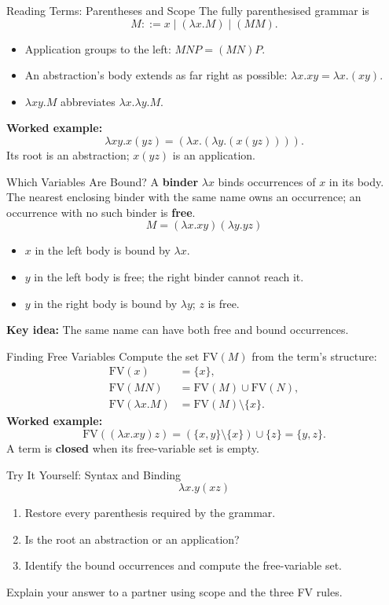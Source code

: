 \documentclass{beamer}
\begin{document}
\begin{frame}{Reading Terms: Parentheses and Scope}
  The fully parenthesised grammar is
  \[M::=x\mid(\lambda x.M)\mid(MM).\]
  \begin{itemize}
    \item Application groups to the left: $MNP=(MN)P$.
    \item An abstraction's body extends as far right as possible:
      $\lambda x.xy=\lambda x.(xy)$.
    \item $\lambda xy.M$ abbreviates $\lambda x.\lambda y.M$.
  \end{itemize}
  \textbf{Worked example:}
  \[\lambda xy.x(yz)=(\lambda x.(\lambda y.(x(yz)))).\]
  Its root is an abstraction; $x(yz)$ is an application.
\end{frame}
\begin{frame}{Which Variables Are Bound?}
  A \textbf{binder} $\lambda x$ binds occurrences of $x$ in its body.
  The nearest enclosing binder with the same name owns an occurrence;
  an occurrence with no such binder is \textbf{free}.
  \[M=(\lambda x.xy)(\lambda y.yz)\]
  \begin{itemize}
    \item $x$ in the left body is bound by $\lambda x$.
    \item $y$ in the left body is free; the right binder cannot reach it.
    \item $y$ in the right body is bound by $\lambda y$; $z$ is free.
  \end{itemize}
  \textbf{Key idea:} The same name can have both free and bound occurrences.
\end{frame}
\begin{frame}{Finding Free Variables}
  Compute the set $\mathrm{FV}(M)$ from the term's structure:
  \begin{align*}
    \mathrm{FV}(x)&=\{x\},\\
    \mathrm{FV}(MN)&=\mathrm{FV}(M)\cup\mathrm{FV}(N),\\
    \mathrm{FV}(\lambda x.M)&=\mathrm{FV}(M)\setminus\{x\}.
  \end{align*}
  \textbf{Worked example:}
  \[\mathrm{FV}((\lambda x.xy)z)
    =(\{x,y\}\setminus\{x\})\cup\{z\}=\{y,z\}.\]
  A term is \textbf{closed} when its free-variable set is empty.
\end{frame}
\begin{frame}{Try It Yourself: Syntax and Binding}
  \[\lambda x.y(xz)\]
  \begin{enumerate}
    \item Restore every parenthesis required by the grammar.
    \item Is the root an abstraction or an application?
    \item Identify the bound occurrences and compute the free-variable set.
  \end{enumerate}
  Explain your answer to a partner using scope and the three FV rules.
\end{frame}
\end{document}
